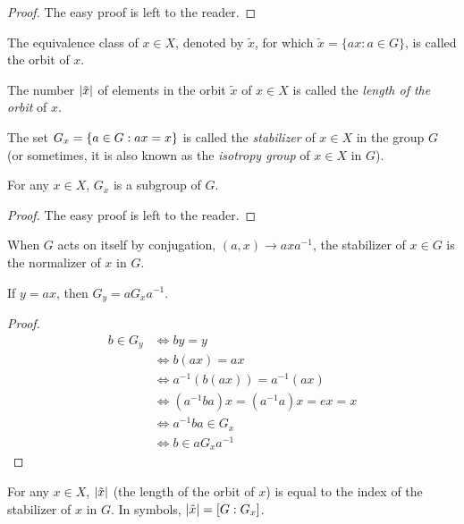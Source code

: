 \documentclass[../main-sheet.tex]{subfiles}
\begin{document}
\begin{proof}
    The easy proof is left to the reader.
\end{proof}
\begin{defn}
    The equivalence class of \(x \in X \), denoted by \(\tilde{x}\), for which \(\tilde{x} = \{ax: a \in G\}\), is called the orbit of \(x\).
\end{defn}
\begin{defn}
    The number \(\left\vert\tilde{x}\right\vert\) of elements in the orbit \(\tilde{x}\) of \(x \in X\) is called the \emph{length of the orbit} of \(x\).
\end{defn}
\begin{defn}
    The set \(G_x = \left\{a \in G : ax = x\right\}\) is called the \emph{stabilizer} of \(x \in X\) in the group \(G\) (or sometimes, it is also known as the \emph{isotropy group} of \(x \in X\) in \(G\)).
\end{defn}
\begin{ex}
    For any \(x \in X\), \(G_x\) is a subgroup of \(G\).
\end{ex}
\begin{proof}
    The easy proof is left to the reader.
\end{proof}
\begin{note}
    When \(G\) acts on itself by conjugation, \((a, x) \to axa^{-1}\), the stabilizer of \(x \in G\) is the normalizer of \(x\) in \(G\).
\end{note}
\begin{ex}
    If \(y = ax\), then \(G_y = aG_x a^{-1}\).
\end{ex}
\begin{proof}
    \begin{align*}
        b \in G_y & \Leftrightarrow by = y\\
        &\Leftrightarrow b( ax ) = ax\\
        &\Leftrightarrow a^{-1}(b (ax)) = a^{-1}(ax)\\
        &\Leftrightarrow (a^{-1}ba) x = (a^{-1}a)x = ex = x\\
        &\Leftrightarrow a^{-1}ba \in G_x\\
        &\Leftrightarrow b \in aG_xa^{-1}
    \end{align*}
\end{proof}
\begin{thm}
    For any \(x \in X \), \(\left\vert\tilde{x}\right\vert\) (the length of the orbit of \(x\)) is equal to the index of the stabilizer of \(x\) in \(G\). In symbols, \(\left\vert\tilde{x}\right\vert= [G: G_x]\).
\end{thm}
\end{document}
